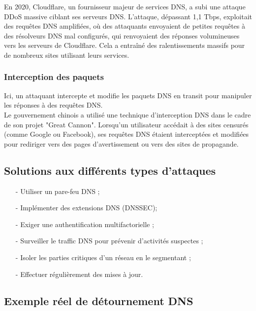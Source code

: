 \documentclass[12pt,a4paper]{article}
\begin{document}
		En 2020, Cloudflare, un fournisseur majeur de services DNS, a subi une attaque DDoS massive ciblant ses serveurs DNS. L’attaque, dépassant 1,1 Tbps, exploitait des requêtes DNS amplifiées, où des attaquants envoyaient de petites requêtes à des résolveurs DNS mal configurés, qui renvoyaient des réponses volumineuses vers les serveurs de Cloudflare. Cela a entraîné des ralentissements massifs pour de nombreux sites utilisant leurs services.
		
		\subsubsection{Interception des paquets}	
		
		Ici, un attaquant intercepte et modifie les paquets DNS en transit pour manipuler les réponses à des requêtes DNS. \\
		
		Le gouvernement chinois a utilisé une technique d’interception DNS dans le cadre de son projet "Great Cannon". Lorsqu’un utilisateur accédait à des sites censurés (comme Google ou Facebook), ses requêtes DNS étaient interceptées et modifiées pour rediriger vers des pages d’avertissement ou vers des sites de propagande.
		
		
	\subsection{Solutions aux différents types d'attaques}
	
	\begin{itemize}
		\item[-] Utiliser un pare-feu DNS ;
		\item[-] Implémenter des extensions DNS (DNSSEC);
		\item[-] Exiger une authentification multifactorielle ;
		\item[-] Surveiller le traffic DNS pour prévenir d'activités suspectes ;
		\item[-] Isoler les parties critiques d'un réseau en le segmentant ;
		\item[-] Effectuer régulièrement des mises à jour.
		
	\end{itemize}
				
	\subsection{Exemple réel de détournement DNS}
	
\end{document}

